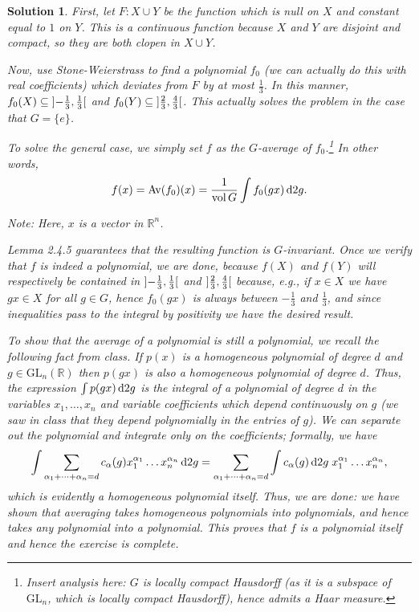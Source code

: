 \documentclass{article}
\theoremstyle{nonumberplain}
\newtheorem{sol}{Solution}
\newcommand{\R}{\mathbb{R}}
\DeclareMathOperator{\vol}{vol}
\DeclareMathOperator{\Av}{Av}
\newcommand{\GL}{\mathrm{GL}}
\begin{document}
\begin{sol}
First, let $F \colon X \cup Y$ be the function which is null on $X$ and constant equal to $1$ on $Y$. This is a continuous function because $X$ and $Y$ are disjoint and compact, so they are both clopen in $X \cup Y$.

Now, use Stone-Weierstrass to find a polynomial $f_0$ (we can actually do this with real coefficients) which deviates from $F$ by at most $\frac13$. In this manner, $f_0(X) \subseteq \ointerval{-\frac13}{\frac13}$ and $f_0(Y) \subseteq \ointerval{\frac23}{\frac43}$. This actually solves the problem in the case that $G = \{e\}$.

To solve the general case, we simply set $f$ as the $G$-average of $f_0$.\footnote{Insert analysis here: $G$ is locally compact Hausdorff (as it is a subspace of $\GL_n$, which is locally compact Hausdorff), hence admits a Haar measure.} In other words,
\begin{equation}
f(x) = \Av(f_0)(x) = \frac1{\vol G} \int f_0(gx) \dl2 g.
\end{equation}

Note: Here, $x$ is a vector in $\R^n$.

Lemma 2.4.5 guarantees that the resulting function is $G$-invariant. Once we verify that $f$ is indeed a polynomial, we are done, because $f(X)$ and $f(Y)$ will respectively be contained in $\ointerval{-\frac13}{\frac13}$ and $\ointerval{\frac23}{\frac43}$ because, e.g., if $x \in X$ we have $gx \in X$ for all $g \in G$, hence $f_0(gx)$ is always between $-\frac13$ and $\frac13$, and since inequalities pass to the integral by positivity we have the desired result.

To show that the average of a polynomial is still a polynomial, we recall the following fact from class. If $p(x)$ is a homogeneous polynomial of degree $d$ and $g \in \GL_n(\R)$ then $p(gx)$ is also a homogeneous polynomial of degree $d$. Thus, the expression $\int p(gx) \dl2 g$ is the integral of a polynomial of degree $d$ in the variables $x_1, \dots, x_n$ and variable coefficients which depend continuously on $g$ (we saw in class that they depend polynomially in the entries of $g$). We can separate out the polynomial and integrate only on the coefficients; formally, we have
\begin{equation}
\int \sum_{\alpha_1 + \dots + \alpha_n = d} c_{\alpha}(g) x_1^{\alpha_1} \dots x_n^{\alpha_n} \dl2 g = \sum_{\alpha_1 + \dots + \alpha_n = d} \int c_{\alpha}(g) \dl2g \; x_1^{\alpha_1} \dots x_n^{\alpha_n},
\end{equation}
which is evidently a homogeneous polynomial itself. Thus, we are done: we have shown that averaging takes homogeneous polynomials into polynomials, and hence takes any polynomial into a polynomial. This proves that $f$ is a polynomial itself and hence the exercise is complete.
\end{sol}
\end{document}
